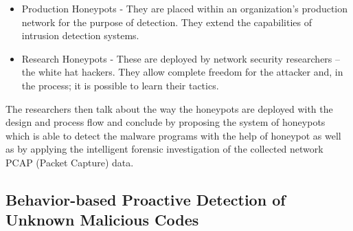 \documentclass[11pt]{article}
\begin{document}
	\begin{itemize}
		\item Production Honeypots - They are placed within an organization’s production network for the purpose of detection. They extend the capabilities of intrusion detection systems.
		\item Research Honeypots - These are deployed by network security researchers – the white hat hackers. They allow complete freedom for the attacker and, in the process; it is possible to learn their tactics.
	\end{itemize}
	The researchers then talk about the way the honeypots are deployed with the design and process flow and conclude by proposing the system of honeypots which is able to detect the malware programs with the help of honeypot as well as by applying the intelligent forensic investigation of the collected network PCAP (Packet Capture) data.
	
	\subsection{Behavior-based Proactive Detection of Unknown Malicious Codes}
	
\end{document}
